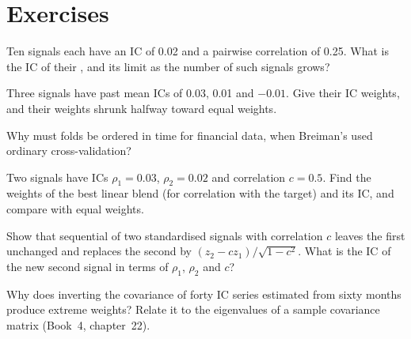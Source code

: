 \section{Exercises}

\begin{exercise}[$\star$]\label{exo:rs:signal-combination:1}
Ten signals each have an IC of 0.02 and a pairwise correlation of 0.25. What is the IC of their , and its limit as the number of
such signals grows?
\end{exercise}

\begin{exercise}[$\star$]\label{exo:rs:signal-combination:2}
Three signals have past mean ICs of 0.03, 0.01 and $-0.01$. Give their IC weights, and their weights shrunk halfway toward equal weights.
\end{exercise}

\begin{exercise}[$\star$]\label{exo:rs:signal-combination:3}
Why must  folds be ordered in time for financial data, when Breiman's  used ordinary cross-validation?
\end{exercise}

\begin{exercise}[$\star\star$]\label{exo:rs:signal-combination:4}
Two signals have ICs $\rho_1 = 0.03$, $\rho_2 = 0.02$ and correlation $c = 0.5$. Find the weights of the best linear blend (for correlation with the
target) and its IC, and compare with equal weights.
\end{exercise}

\begin{exercise}[$\star\star$]\label{exo:rs:signal-combination:5}
Show that sequential  of two standardised signals with correlation $c$ leaves the first unchanged and replaces the second by
$(z_2 - cz_1)/\sqrt{1 - c^2}$. What is the IC of the new second signal in terms of $\rho_1$, $\rho_2$ and $c$?
\end{exercise}

\begin{exercise}[$\star\star$]\label{exo:rs:signal-combination:6}
Why does inverting the covariance of forty IC series estimated from sixty months produce extreme weights? Relate it to the eigenvalues of a sample
covariance matrix (Book~4, chapter~22).
\end{exercise}

